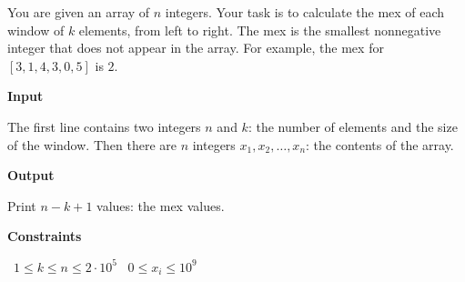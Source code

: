 You are given an array of $n$ integers. Your task is to calculate the mex of each window of $k$ elements, from left to right.
The mex is the smallest nonnegative integer that does not appear in the array. For example, the mex for $[3,1,4,3,0,5]$ is $2$.

\vspace{0.3cm}\noindent\textbf{Input}

The first line contains two integers $n$ and $k$: the number of elements and the size of the window.
Then there are $n$ integers $x_1,x_2,\ldots,x_n$: the contents of the array.

\vspace{0.3cm}\noindent\textbf{Output}

Print $n-k+1$ values: the mex values.

\vspace{0.3cm}\noindent\textbf{Constraints}

\textbullet\ $1 \le k \le n \le 2 \cdot 10^5$
\textbullet\ $0 \le x_i \le 10^9$